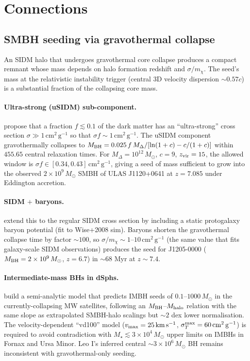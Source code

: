 \documentclass[12pt]{article}
\newcommand{\cmg}{\,\mathrm{cm^2\,g^{-1}}}
\newcommand{\kms}{\,\mathrm{km\,s^{-1}}}
\newcommand{\Msun}{\,M_\odot}
\newcommand{\smx}{\sigma/m_\chi}
\begin{document}
\section{Connections}
\label{sec:connections}

\subsection{SMBH seeding via gravothermal collapse}

An SIDM halo that undergoes gravothermal core collapse produces a
compact remnant whose mass depends on halo formation redshift and
$\smx$.  The seed's mass at the relativistic instability trigger
(central 3D velocity dispersion $\sim 0.57c$) is a substantial
fraction of the collapsing core mass.

\paragraph{Ultra-strong (uSIDM) sub-component.}
\citet{Pollack2015} propose that a fraction $f\lesssim 0.1$ of the
dark matter has an ``ultra-strong'' cross section $\sigma\gg 1\cmg$
so that $\sigma f\sim 1\cmg$.  The uSIDM component gravothermally
collapses to
$M_{\rm BH} = 0.025\,f\,M_\Delta/[\ln(1+c)-c/(1+c)]$ within
$455.65$ central relaxation times.  For $M_\Delta = 10^{12}\Msun$,
$c=9$, $z_{\rm vir}=15$, the allowed window is
$\sigma f \in [0.34, 0.43]\cmg$, giving a seed of mass sufficient
to grow into the observed $2\times 10^9\Msun$ SMBH of ULAS J1120+0641
at $z=7.085$ under Eddington accretion.

\paragraph{SIDM $+$ baryons.}  \citet{Feng2021} extend this to the
regular SIDM cross section by including a static protogalaxy baryon
potential (fit to Wise+2008 sim).  Baryons shorten the gravothermal
collapse time by factor $\sim 100$, so $\smx\sim 1$--$10\cmg$
(the same value that fits galaxy-scale SIDM observations) produces the
seed for J1205-0000 ($M_{\rm BH} = 2\times 10^9\Msun$, $z=6.7$) in
$\sim 68$ Myr at $z\sim 7.4$.

\paragraph{Intermediate-mass BHs in dSphs.}  \citet{Meshveliani2023}
build a semi-analytic model that predicts IMBH seeds of $0.1$--$1000
\Msun$ in the currently-collapsing MW satellites, following an
$M_{\rm BH}$--$M_{\rm halo}$ relation with the same slope as
extrapolated SMBH-halo scalings but $\sim 2$ dex lower normalisation.
The velocity-dependent ``vd100'' model
($v_{\rm max} = 25\kms$, $\sigma_T^{\rm max} = 60\cmg$) is required to
avoid contradiction with $M_\star\lesssim 3\times 10^4\Msun$ upper
limits on IMBHs in Fornax and Ursa Minor.  Leo I's inferred central
$\sim 3\times 10^6\Msun$ BH remains inconsistent with gravothermal-only
seeding.
\end{document}
